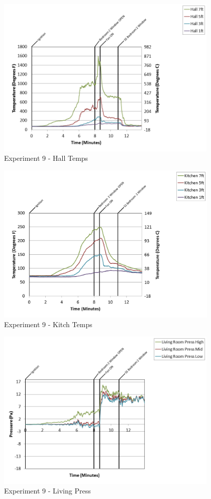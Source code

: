 \documentclass{article}
\begin{document}
\begin{appendices}
\clearpage

\begin{figure}[h!]
	\centering
	\includegraphics[height=3.05in]{0_Images/Results_Charts/Exp_9_Charts/HallTemps.png}
	\caption{Experiment 9 - Hall Temps}
\end{figure}


\begin{figure}[h!]
	\centering
	\includegraphics[height=3.05in]{0_Images/Results_Charts/Exp_9_Charts/KitchTemps.png}
	\caption{Experiment 9 - Kitch Temps}
\end{figure}

\clearpage

\begin{figure}[h!]
	\centering
	\includegraphics[height=3.05in]{0_Images/Results_Charts/Exp_9_Charts/LivingPress.png}
	\caption{Experiment 9 - Living Press}
\end{figure}



\end{appendices}
\end{document}
